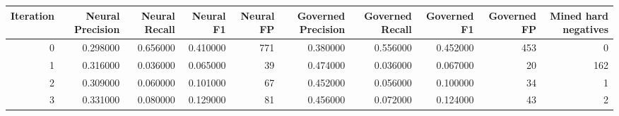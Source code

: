 \begin{tabular}{rrrrrrrrrr}
\toprule
Iteration & Neural Precision & Neural Recall & Neural F1 & Neural FP & Governed Precision & Governed Recall & Governed F1 & Governed FP & Mined hard negatives \\
\midrule
0 & 0.298000 & 0.656000 & 0.410000 & 771 & 0.380000 & 0.556000 & 0.452000 & 453 & 0 \\
1 & 0.316000 & 0.036000 & 0.065000 & 39 & 0.474000 & 0.036000 & 0.067000 & 20 & 162 \\
2 & 0.309000 & 0.060000 & 0.101000 & 67 & 0.452000 & 0.056000 & 0.100000 & 34 & 1 \\
3 & 0.331000 & 0.080000 & 0.129000 & 81 & 0.456000 & 0.072000 & 0.124000 & 43 & 2 \\
\bottomrule
\end{tabular}
